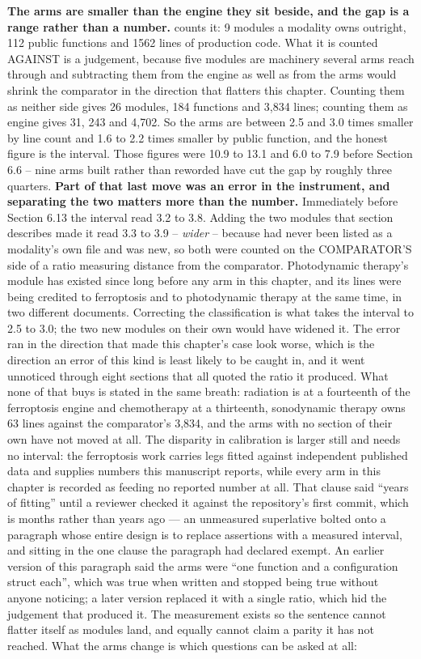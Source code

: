 \documentclass[11pt,twoside,openright]{report}
\begin{document}
\textbf{The arms are smaller than the engine they sit beside, and the gap is a range rather than a number.}  counts it: 9 modules a modality owns outright, 112 public functions and 1562 lines of production code. What it is counted AGAINST is a judgement, because five modules are machinery several arms reach through and subtracting them from the engine as well as from the arms would shrink the comparator in the direction that flatters this chapter. Counting them as neither side gives 26 modules, 184 functions and 3,834 lines; counting them as engine gives 31, 243 and 4,702. So the arms are between 2.5 and 3.0 times smaller by line count and 1.6 to 2.2 times smaller by public function, and the honest figure is the interval. Those figures were 10.9 to 13.1 and 6.0 to 7.9 before Section 6.6 -- nine arms built rather than reworded have cut the gap by roughly three quarters.  \textbf{Part of that last move was an error in the instrument, and separating the two matters more than the number.} Immediately before Section 6.13 the interval read 3.2 to 3.8. Adding the two modules that section describes made it read 3.3 to 3.9 -- \textit{wider} -- because  had never been listed as a modality's own file and  was new, so both were counted on the COMPARATOR'S side of a ratio measuring distance from the comparator. Photodynamic therapy's module has existed since long before any arm in this chapter, and its lines were being credited to ferroptosis and to photodynamic therapy at the same time, in two different documents. Correcting the classification is what takes the interval to 2.5 to 3.0; the two new modules on their own would have widened it. The error ran in the direction that made this chapter's case look worse, which is the direction an error of this kind is least likely to be caught in, and it went unnoticed through eight sections that all quoted the ratio it produced.  What none of that buys is stated in the same breath: radiation is at a fourteenth of the ferroptosis engine and chemotherapy at a thirteenth, sonodynamic therapy owns 63 lines against the comparator's 3,834, and the arms with no section of their own have not moved at all. The disparity in calibration is larger still and needs no interval: the ferroptosis work carries legs fitted against independent published data and supplies numbers this manuscript reports, while every arm in this chapter is recorded as feeding no reported number at all. That clause said ``years of fitting'' until a reviewer checked it against the repository's first commit, which is months rather than years ago --- an unmeasured superlative bolted onto a paragraph whose entire design is to replace assertions with a measured interval, and sitting in the one clause the paragraph had declared exempt. An earlier version of this paragraph said the arms were ``one function and a configuration struct each'', which was true when written and stopped being true without anyone noticing; a later version replaced it with a single ratio, which hid the judgement that produced it. The measurement exists so the sentence cannot flatter itself as modules land, and equally cannot claim a parity it has not reached. What the arms change is which questions can be asked at all: 
\end{document}
